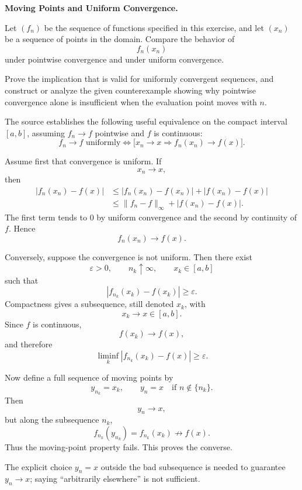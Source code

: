 \begin{problem}[CP-II-0015]
\label{prob:cp-ii-0015}
\textbf{Moving Points and Uniform Convergence.}

\hspace*{1.5em}Let \((f_n)\) be the sequence of functions specified in this exercise, and let
\((x_n)\) be a sequence of points in the domain. Compare the behavior of
\[
f_n(x_n)
\]
under pointwise convergence and under uniform convergence.

Prove the implication that is valid for uniformly convergent sequences, and
construct or analyze the given counterexample showing why pointwise convergence
alone is insufficient when the evaluation point moves with \(n\).
\end{problem}

\begin{solution}
The source establishes the following useful equivalence on the compact interval \([a,b]\),
assuming \(f_n\to f\) pointwise and \(f\) is continuous:
\[
\boxed{
f_n\to f\text{ uniformly}
\iff
\bigl[x_n\to x\Longrightarrow f_n(x_n)\to f(x)\bigr].
}
\]

Assume first that convergence is uniform. If
\[
x_n\to x,
\]
then
\[
\begin{aligned}
|f_n(x_n)-f(x)|
&\le
|f_n(x_n)-f(x_n)|
+
|f(x_n)-f(x)|\\
&\le
\|f_n-f\|_\infty
+
|f(x_n)-f(x)|.
\end{aligned}
\]
The first term tends to \(0\) by uniform convergence and the second by continuity of \(f\).
Hence
\[
f_n(x_n)\to f(x).
\]

Conversely, suppose the convergence is not uniform. Then there exist
\[
\varepsilon>0,\qquad
n_k\uparrow\infty,\qquad
x_k\in[a,b]
\]
such that
\[
|f_{n_k}(x_k)-f(x_k)|\ge\varepsilon.
\]
Compactness gives a subsequence, still denoted \(x_k\), with
\[
x_k\to x\in[a,b].
\]
Since \(f\) is continuous,
\[
f(x_k)\to f(x),
\]
and therefore
\[
\liminf_k
|f_{n_k}(x_k)-f(x)|
\ge
\varepsilon.
\]

Now define a full sequence of moving points by
\[
y_{n_k}=x_k,
\qquad
y_n=x
\quad\text{if }n\notin\{n_k\}.
\]
Then
\[
y_n\to x,
\]
but along the subsequence \(n_k\),
\[
f_{n_k}(y_{n_k})=f_{n_k}(x_k)\not\to f(x).
\]
Thus the moving-point property fails. This proves the converse.

The explicit choice \(y_n=x\) outside the bad subsequence is needed to guarantee
\(y_n\to x\); saying ``arbitrarily elsewhere'' is not sufficient.
\end{solution}


